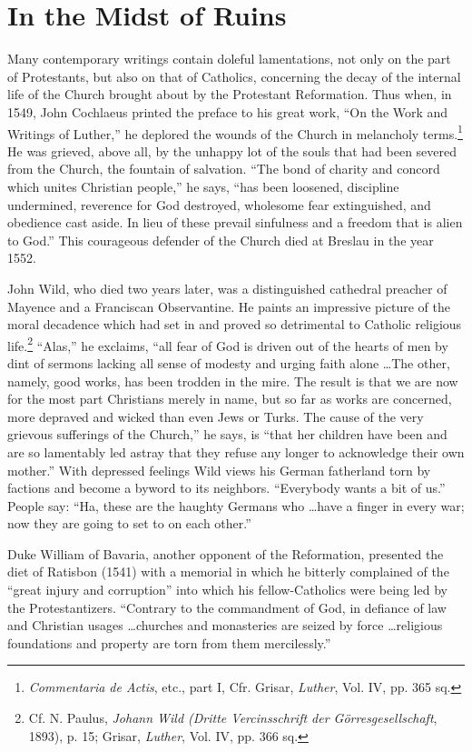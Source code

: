 \section{In the Midst of Ruins}

Many contemporary writings contain doleful lamentations, not
only on the part of Protestants, but also on that of Catholics, concerning
the decay of the internal life of the Church brought about
by the Protestant Reformation. Thus when, in 1549, John Cochlaeus
printed the preface to his great work, “On the Work and Writings
of Luther,” he deplored the wounds of the Church in melancholy
terms.\footnote{\textit{Commentaria de Actis}, etc., part I, Cfr. Grisar, \textit{Luther}, Vol. IV, pp. 365 sq.}
 He was grieved, above all, by the unhappy lot of the souls
that had been severed from the Church, the fountain of salvation.
“The bond of charity and concord which unites Christian people,”
he says, “has been loosened, discipline undermined, reverence for God
destroyed, wholesome fear extinguished, and obedience cast aside. In
lieu of these prevail sinfulness and a freedom that is alien to God.”
This courageous defender of the Church died at Breslau in the year
1552.

John Wild, who died two years later, was a distinguished cathedral
preacher of Mayence and a Franciscan Observantine. He paints an
impressive picture of the moral decadence which had set in and
proved so detrimental to Catholic religious life.\footnote
{Cf. N. Paulus, \textit{Johann Wild (Dritte Vercinsschrift der Görresgesellschaft}, 1893), p. 15;
Grisar, \textit{Luther}, Vol. IV, pp. 366 sq.}
“Alas,” he exclaims,
“all fear of God is driven out of the hearts of men by dint of sermons
lacking all sense of modesty and urging faith alone \dots The other,
namely, good works, has been trodden in the mire. The result is that
we are now for the most part Christians merely in name, but so far
as works are concerned, more depraved and wicked than even Jews
or Turks. The cause of the very grievous sufferings of the Church,”
he says, is “that her children have been and are so lamentably led
astray that they refuse any longer to acknowledge their own mother.”
With depressed feelings Wild views his German fatherland torn by
factions and become a byword to its neighbors. “Everybody wants a
bit of us.” People say: “Ha, these are the haughty Germans who \dots have
a finger in every war; now they are going to set to on each
other.”

Duke William of Bavaria, another opponent of the Reformation,
presented the diet of Ratisbon (1541) with a memorial in which
he bitterly complained of the “great injury and corruption” into
which his fellow-Catholics were being led by the Protestantizers.
“Contrary to the commandment of God, in defiance of law and Christian
usages \dots churches and monasteries are seized by force \dots religious
foundations and property are torn from them mercilessly.”

